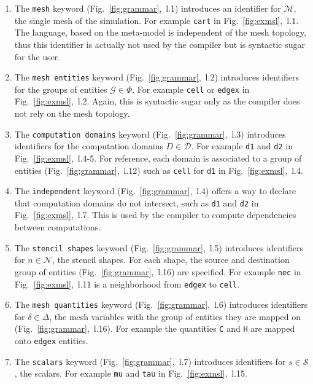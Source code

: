 \begin{enumerate}

\item The \texttt{mesh} keyword (Fig.~\ref{fig:grammar},~l.1) introduces an identifier for $\mathcal{M}$, the single mesh of the simulation. For example \texttt{cart} in Fig.~\ref{fig:exmsl},~l.1. The language, based on the meta-model is independent of the mesh topology, thus this identifier is actually not used by the compiler but is syntactic sugar for the user.

\item The \texttt{mesh entities} keyword (Fig.~\ref{fig:grammar},~l.2) introduces identifiers for the groups of entities $\mathcal{G}\in\Phi$. For example \texttt{cell} or \texttt{edgex} in Fig.~\ref{fig:exmsl},~l.2. Again, this is syntactic sugar only as the compiler does not rely on the mesh topology.

\item The \texttt{computation domains} keyword (Fig.~\ref{fig:grammar},~l.3) introduces identifiers for the computation domains $D\in\mathcal{D}$. For example \texttt{d1} and \texttt{d2} in Fig.~\ref{fig:exmsl},~l.4-5. For reference, each domain is associated to a group of entities (Fig.~\ref{fig:grammar},~l.12) such as \texttt{cell} for \texttt{d1} in Fig.~\ref{fig:exmsl},~l.4.

\item The \texttt{independent} keyword (Fig.~\ref{fig:grammar},~l.4) offers a way to declare that computation domains do not intersect, such as \texttt{d1} and \texttt{d2} in  Fig.~\ref{fig:exmsl},~l.7. This is used by the compiler to compute dependencies between computations.

\item The \texttt{stencil shapes} keyword (Fig.~\ref{fig:grammar},~l.5) introduces identifiers for $n\in\mathcal{N}$, the stencil shapes. For each shape, the source and destination group of entities (Fig.~\ref{fig:grammar},~l.16) are specified. For example \texttt{nec} in Fig.~\ref{fig:exmsl},~l.11 is a neighborhood from \texttt{edgex} to \texttt{cell}.

\item The \texttt{mesh quantities} keyword (Fig.~\ref{fig:grammar},~l.6) introduces identifiers for $\delta\in\Delta$, the mesh variables with the group of entities they are mapped on (Fig.~\ref{fig:grammar},~l.16). For example the quantities \texttt{C} and \texttt{H} are mapped onto \texttt{edgex} entities.

\item The \texttt{scalars} keyword (Fig.~\ref{fig:grammar},~l.7) introduces identifiers for $s\in\mathcal{S}$, the scalars. For example \texttt{mu} and \texttt{tau} in Fig.~\ref{fig:exmsl},~l.15. 


\end{enumerate}
